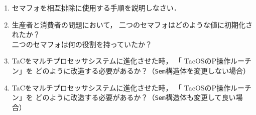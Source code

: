 \begin{enumerate}
\item セマフォを相互排除に使用する手順を説明しなさい．

\item 生産者と消費者の問題において，
二つのセマフォはどのような値に初期化されたか？\\
二つのセマフォは何の役割を持っていたか？

\item TaCをマルチプロセッサシステムに進化させた時，
「 TacOSのP操作ルーチン」を
どのように改造する必要があるか？（{\tt Sem}構造体を変更しない場合）

\item TaCをマルチプロセッサシステムに進化させた時，
「 TacOSのP操作ルーチン」を
どのように改造する必要があるか？（{\tt Sem}構造体も変更して良い場合）
\end{enumerate}
